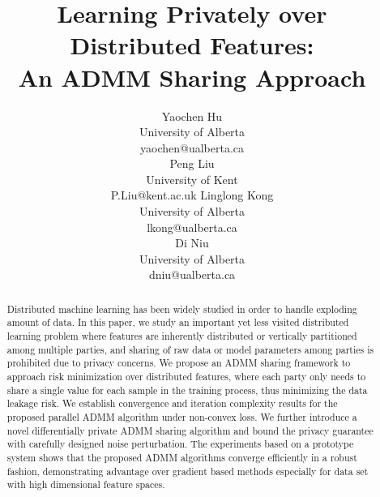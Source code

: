 \documentclass{article}
\title{Learning Privately over Distributed Features:\\An ADMM Sharing Approach}
\author{
 Yaochen Hu\\
 University of Alberta\\
 yaochen@ualberta.ca\\
 \And
 Peng Liu\\
 University of Kent\\
 P.Liu@kent.ac.uk
 \And
 Linglong Kong\\
 University of Alberta\\
 lkong@ualberta.ca\\
 \And
 Di Niu\\
 University of Alberta\\
 dniu@ualberta.ca
}
\begin{document}

\maketitle

\begin{abstract}
Distributed machine learning has been widely studied in order to handle exploding amount of data.
In this paper, we study an important yet less visited distributed learning problem where features are inherently distributed or vertically partitioned among multiple parties, and sharing of raw data or model parameters among parties is prohibited due to privacy concerns.
We propose an ADMM sharing framework to approach risk minimization over distributed features, where each party only needs to share a single value for each sample in the training process, thus minimizing the data leakage risk.
We establish convergence and iteration complexity results for the proposed parallel ADMM algorithm under non-convex loss. We further introduce a novel differentially private ADMM sharing algorithm and bound the privacy guarantee with carefully designed noise perturbation. The experiments based on a prototype system shows that the proposed ADMM algorithms converge efficiently in a robust fashion, demonstrating advantage over gradient based methods especially for data set with high dimensional feature spaces.
\end{abstract}








\newpage
% 




\end{document}
